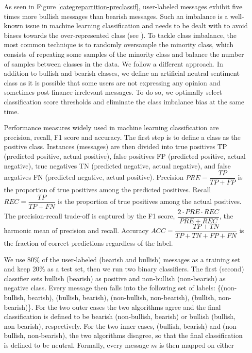 As seen in Figure \ref{categrepartition-preclassif}, user-labeled messages exhibit five times more bullish messages than bearish messages. Such an imbalance is a well-known issue in machine learning classification and needs to be dealt with to avoid biases towards the over-represented class (see \citet{chawla2004special}). To tackle class imbalance, the most common technique is to randomly oversample the minority class, which consists of repeating some samples of the minority class and balance the number of samples between classes in the data. We follow a different approach. In addition to bullish and bearish classes, we define an artificial neutral sentiment class as it is possible that some users are not expressing any opinion and sometimes post finance-irrelevant messages. To do so, we optimally select classification score thresholds and eliminate the class imbalance bias at the same time.

Performance measures widely used in machine learning classification are precision, recall, F1 score and accuracy. The first step is to define a class as the positive class. Instances (messages) are then divided into true positives TP (predicted positive, actual positive), false positives FP (predicted positive, actual negative), true negatives TN (predicted negative, actual negative), and false negatives FN (predicted negative, actual positive). Precision $PRE=\dfrac{TP}{TP+FP}$ is the proportion of true positives among the predicted positives. Recall $REC = \dfrac{TP}{TP+FN}$ is the proportion of true positives among the actual positives. The precision-recall trade-off is captured by the F1 score, $\dfrac{2 \cdot PRE \cdot REC}{PRE + REC}$, the harmonic mean of precision and recall. Accuracy $ACC = \dfrac{TP+TN}{TP+TN+FP+FN}$ is the fraction of correct predictions regardless of the label.
 

We use 80\% of the user-labeled (bearish and bullish) messages as a training set and keep 20\% as a test set, then we run two binary classifiers. The first (second) classifier sets bullish (bearish) as positive and non-bullish (non-bearish) as negative class. Every message then falls into the following set of labels: \{(non-bullish, bearish), (bullish, bearish), (non-bullish, non-bearish), (bullish, non-bearish)\}. For the two outer cases the two algorithms agree and the final classification is defined to be bearish (non-bullish, bearish) or bullish (bullish, non-bearish), respectively. For the two inner cases, (bullish, bearish) and (non-bullish, non-bearish), the two algorithms disagree, so that the final classification is defined to be neutral. Formally, every message $m$ is then mapped on either

